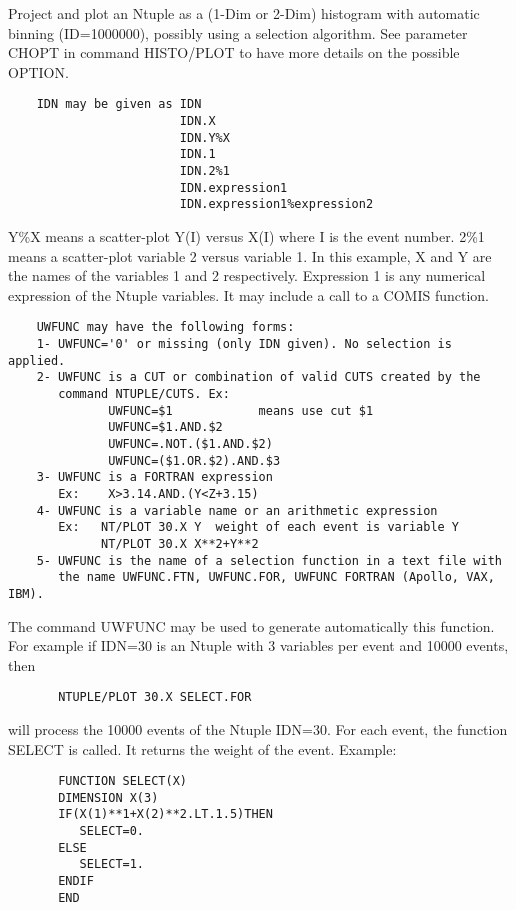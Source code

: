    \par
Project and plot an Ntuple as a (1-Dim or 2-Dim) histogram with automatic 
   binning (ID=1000000), possibly using a selection algorithm. See parameter 
   CHOPT in command HISTO/PLOT to have more details on the possible OPTION.  
\begin{verbatim}
    IDN may be given as IDN
                        IDN.X
                        IDN.Y%X
                        IDN.1
                        IDN.2%1
                        IDN.expression1
                        IDN.expression1%expression2
\end{verbatim}
   \par
Y\%X means a scatter-plot Y(I) versus X(I) where I is the event number.  
   2\%1 means a scatter-plot variable 2 versus variable 1.  In this example, X 
   and Y are the names of the variables 1 and 2 respectively.  Expression 1 is 
   any numerical expression of the Ntuple variables.  It may include a call to 
   a COMIS function.  
\begin{verbatim}
    UWFUNC may have the following forms:
    1- UWFUNC='0' or missing (only IDN given). No selection is applied.
    2- UWFUNC is a CUT or combination of valid CUTS created by the
       command NTUPLE/CUTS. Ex:
              UWFUNC=$1            means use cut $1
              UWFUNC=$1.AND.$2
              UWFUNC=.NOT.($1.AND.$2)
              UWFUNC=($1.OR.$2).AND.$3
    3- UWFUNC is a FORTRAN expression
       Ex:    X>3.14.AND.(Y<Z+3.15)
    4- UWFUNC is a variable name or an arithmetic expression
       Ex:   NT/PLOT 30.X Y  weight of each event is variable Y
             NT/PLOT 30.X X**2+Y**2
    5- UWFUNC is the name of a selection function in a text file with
       the name UWFUNC.FTN, UWFUNC.FOR, UWFUNC FORTRAN (Apollo, VAX, IBM).
\end{verbatim}
   \par
The command UWFUNC may be used to generate automatically this function.  
   For example if IDN=30 is an Ntuple with 3 variables per event and 10000 
   events, then 
\begin{verbatim}
       NTUPLE/PLOT 30.X SELECT.FOR
\end{verbatim}
   \par
will process the 10000 events of the Ntuple IDN=30. For each event, the 
   function SELECT is called. It returns the weight of the event.  Example:  
\begin{verbatim}
       FUNCTION SELECT(X)
       DIMENSION X(3)
       IF(X(1)**1+X(2)**2.LT.1.5)THEN
          SELECT=0.
       ELSE
          SELECT=1.
       ENDIF
       END
\end{verbatim}
